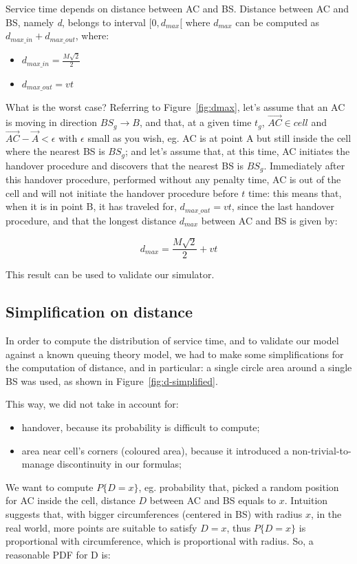 \documentclass[a4paper,12pt]{article}
\begin{document}
Service time depends on distance between AC and BS.
Distance between AC and BS, namely \emph{d}, belongs to interval $[ 0, d_{max} [$ where $d_{max}$ can be computed as $d_{max\_in} + d_{max\_out}$, where:
\begin{itemize}
  \item $d_{max\_in} = \frac{M \sqrt{2}}{2} $
  \item $d_{max\_out} = vt$
\end{itemize}

What is the worst case? Referring to Figure~\ref{fig:dmax}, let's assume that an AC is moving in direction $BS_g \rightarrow B$, and that, at a given time $t_g$, $\overrightarrow{AC} \in cell$ and $\overrightarrow{AC} - \overrightarrow{A} < \epsilon$ with $\epsilon$ small as you wish, eg. AC is at point A but still inside the cell where the nearest BS is $BS_g$; and let's assume that, at this time, AC initiates the handover procedure and discovers that the nearest BS is $BS_g$. Immediately after this handover procedure, performed without any penalty time, AC is out of the cell and will not initiate the handover procedure before $t$ time: this means that, when it is in point B, it has traveled for, $d_{max\_out} = v t$, since the last handover procedure, and that the longest distance $d_{max}$ between AC and BS is given by:

$$ d_{max} = \frac{M \sqrt{2}}{2} + vt $$

This result can be used to validate our simulator.

\subsection{Simplification on distance}
In order to compute the distribution of service time, and to validate our model against a known queuing theory model, we had to make some simplifications for the computation of distance, and in particular: a single circle area around a single BS was used, as shown in Figure~\ref{fig:d-simplified}.

This way, we did not take in account for:
\begin{itemize}
  \item handover, because its probability is difficult to compute;
  \item area near cell's corners (coloured area), because it introduced a non-trivial-to-manage discontinuity in our formulas;
\end{itemize}

We want to compute $P\{D = x\}$, eg. probability that, picked a random position for AC inside the cell, distance $D$ between AC and BS equals to $x$.
Intuition suggests that, with bigger circumferences (centered in BS) with radius $x$, in the real world, more points are suitable to satisfy $D = x$, thus $P\{D = x\}$ is proportional with circumference, which is proportional with radius.
So, a reasonable PDF for D is:
\end{document}
